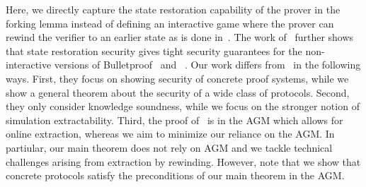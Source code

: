 Here, we directly capture the state restoration capability of the prover in the forking lemma instead of defining an interactive game where the prover can rewind the verifier to an earlier state as is done in~\cite{C:GhoTes21}. 
The work of~\cite{C:GhoTes21} further shows that state restoration security gives tight security guarantees for the
non-interactive versions of Bulletproof~\cite{SP:BBBPWM18} and \sonic~. 
Our work differs from~\cite{C:GhoTes21} in the following ways. First, they
focus on showing security of concrete proof systems, while we show
a general theorem about the security of a wide class of protocols. 
Second, they only consider knowledge soundness, while we focus on the stronger notion of simulation extractability. Third, the proof of~\cite{C:GhoTes21} is in the AGM which allows for online extraction, whereas we aim to minimize our reliance on the AGM. In partiular, our main theorem does not rely on AGM and we tackle technical challenges arising from extraction by rewinding. 
However, note that we show that concrete protocols satisfy the preconditions of our main theorem in the AGM.





